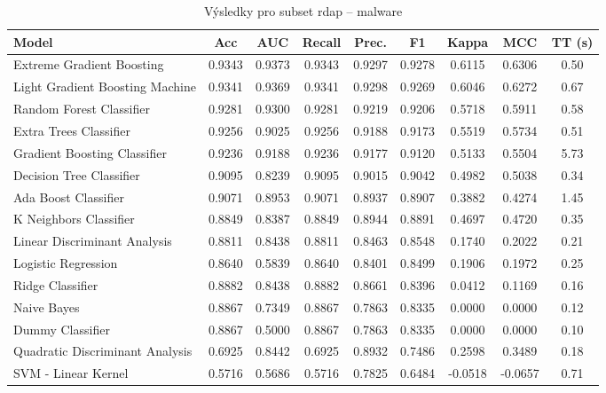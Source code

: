 \begin{table}[H]
  \centering
  \small
  \caption{Výsledky pro subset rdap – malware}
  \begin{tabular}{|l|c|c|c|c|c|c|c|c|}
    \hline
    \textbf{Model} & \textbf{Acc} & \textbf{AUC} & \textbf{Recall} & \textbf{Prec.} & \textbf{F1} & \textbf{Kappa} & \textbf{MCC} & \textbf{TT (s)} \\
    \hline
    Extreme Gradient Boosting & 0.9343 & 0.9373 & 0.9343 & 0.9297 & 0.9278 & 0.6115 & 0.6306 & 0.50 \\
    Light Gradient Boosting Machine & 0.9341 & 0.9369 & 0.9341 & 0.9298 & 0.9269 & 0.6046 & 0.6272 & 0.67 \\
    Random Forest Classifier & 0.9281 & 0.9300 & 0.9281 & 0.9219 & 0.9206 & 0.5718 & 0.5911 & 0.58 \\
    Extra Trees Classifier & 0.9256 & 0.9025 & 0.9256 & 0.9188 & 0.9173 & 0.5519 & 0.5734 & 0.51 \\
    Gradient Boosting Classifier & 0.9236 & 0.9188 & 0.9236 & 0.9177 & 0.9120 & 0.5133 & 0.5504 & 5.73 \\
    Decision Tree Classifier & 0.9095 & 0.8239 & 0.9095 & 0.9015 & 0.9042 & 0.4982 & 0.5038 & 0.34 \\
    Ada Boost Classifier & 0.9071 & 0.8953 & 0.9071 & 0.8937 & 0.8907 & 0.3882 & 0.4274 & 1.45 \\
    K Neighbors Classifier & 0.8849 & 0.8387 & 0.8849 & 0.8944 & 0.8891 & 0.4697 & 0.4720 & 0.35 \\
    Linear Discriminant Analysis & 0.8811 & 0.8438 & 0.8811 & 0.8463 & 0.8548 & 0.1740 & 0.2022 & 0.21 \\
    Logistic Regression & 0.8640 & 0.5839 & 0.8640 & 0.8401 & 0.8499 & 0.1906 & 0.1972 & 0.25 \\
    Ridge Classifier & 0.8882 & 0.8438 & 0.8882 & 0.8661 & 0.8396 & 0.0412 & 0.1169 & 0.16 \\
    Naive Bayes & 0.8867 & 0.7349 & 0.8867 & 0.7863 & 0.8335 & 0.0000 & 0.0000 & 0.12 \\
    Dummy Classifier & 0.8867 & 0.5000 & 0.8867 & 0.7863 & 0.8335 & 0.0000 & 0.0000 & 0.10 \\
    Quadratic Discriminant Analysis & 0.6925 & 0.8442 & 0.6925 & 0.8932 & 0.7486 & 0.2598 & 0.3489 & 0.18 \\
    SVM - Linear Kernel & 0.5716 & 0.5686 & 0.5716 & 0.7825 & 0.6484 & -0.0518 & -0.0657 & 0.71 \\
    \hline
  \end{tabular}
\end{table}
\vspace{0.5cm}

